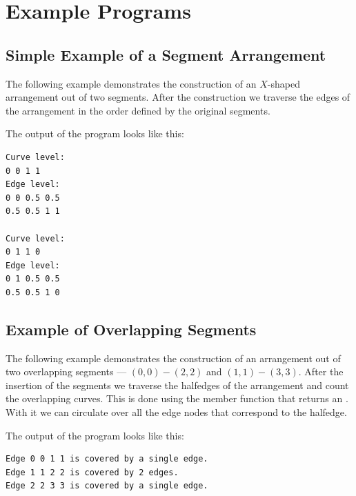


\section{Example Programs}
\subsection{Simple Example of a Segment Arrangement}
The following example demonstrates the construction of an
$X$-shaped arrangement out of two segments.
After the construction we
traverse the edges of the arrangement in the order defined
by the original segments.


The output of the program looks like this:
\begin{verbatim}
Curve level:
0 0 1 1
Edge level:
0 0 0.5 0.5
0.5 0.5 1 1

Curve level:
0 1 1 0
Edge level:
0 1 0.5 0.5
0.5 0.5 1 0
\end{verbatim}

\subsection{Example of Overlapping Segments}
\label{ssec:example2}
The following example demonstrates the construction of an
arrangement out of two overlapping segments --- $(0,0)-(2,2)$
and $(1,1)-(3,3)$.
After the insertion of the segments we
traverse the halfedges
of the arrangement and count the overlapping curves.
This is done using the  member function that returns an
. With it we can circulate
over all the edge nodes that correspond to the halfedge.


The output of the program looks like this:
\begin{verbatim}
Edge 0 0 1 1 is covered by a single edge.
Edge 1 1 2 2 is covered by 2 edges.
Edge 2 2 3 3 is covered by a single edge.
\end{verbatim}



